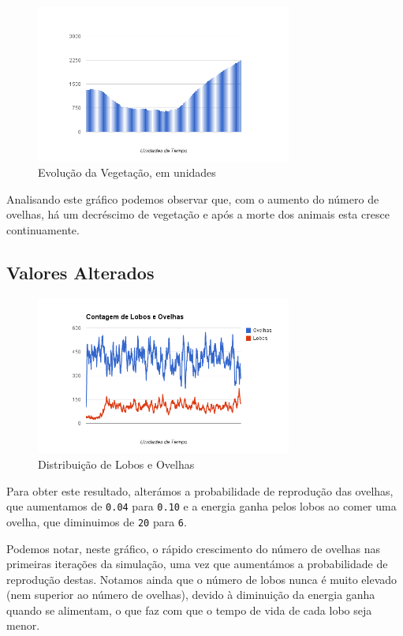 \documentclass[12pt]{article}
\begin{document}
\begin{figure}[H]
  \centering
  \includegraphics[width=0.75\textwidth]{vegetacao1}
  \caption{Evolução da Vegetação, em unidades}
\end{figure}

Analisando este gráfico podemos observar que, com o aumento do número de ovelhas, há um decréscimo de vegetação e após a morte dos animais esta cresce continuamente.

\subsection{Valores Alterados}

\begin{figure}[H]
  \centering
  \includegraphics[width=0.75\textwidth]{ovelhaslobos2}
  \caption{Distribuição de Lobos e Ovelhas}
\end{figure}

Para obter este resultado, alterámos a probabilidade de reprodução das ovelhas, que aumentamos
de \texttt{0.04} para \texttt{0.10} e a energia ganha pelos lobos ao comer uma ovelha, que
diminuimos de \texttt{20} para \texttt{6}.

Podemos notar, neste gráfico, o rápido crescimento do número de ovelhas nas primeiras iterações
da simulação, uma vez que aumentámos a probabilidade de reprodução destas. Notamos ainda que o número de lobos nunca é muito elevado (nem superior ao número de ovelhas), devido à diminuição da energia ganha quando se alimentam, o que faz com que o tempo de vida de cada lobo seja menor.
\end{document}
